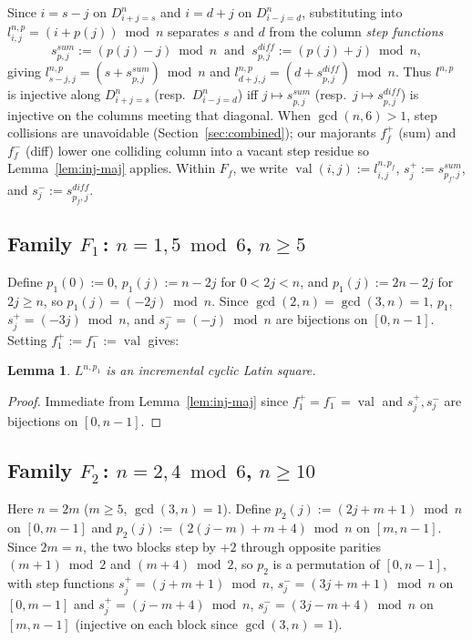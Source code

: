 \documentclass[10pt,a4paper]{article}
\newtheorem{lemma}[theorem]{Lemma}
\theoremstyle{remark}
\newcommand{\val}{\operatorname{val}}
\begin{document}
Since $i = s - j$ on $D^n_{i+j=s}$ and $i = d + j$ on $D^n_{i-j=d}$, substituting into
$l^{n,p}_{i,j} = (i + p(j)) \bmod n$ separates $s$ and $d$ from the column \emph{step functions}
\[
    s^{sum}_{p,j} := (p(j) - j) \bmod n
    \;\;\text{and}\;\;
    s^{dif\!f}_{p,j} := (p(j) + j) \bmod n,
\]
giving $l^{n,p}_{s-j,j} = (s + s^{sum}_{p,j}) \bmod n$ and
$l^{n,p}_{d+j,j} = (d + s^{dif\!f}_{p,j}) \bmod n$. Thus $l^{n,p}$ is injective along $D^n_{i+j=s}$
(resp.\ $D^n_{i-j=d}$) iff $j \mapsto s^{sum}_{p,j}$ (resp.\ $j \mapsto s^{dif\!f}_{p,j}$) is
injective on the columns meeting that diagonal. When $\gcd(n,6) > 1$, step collisions are unavoidable
(Section~\ref{sec:combined}); our majorants $f^+_f$ (sum) and $f^-_f$ (diff) lower one colliding
column into a vacant step residue so Lemma~\ref{lem:inj-maj} applies. Within $F_f$, we write
$\val(i,j) := l^{n,p_f}_{i,j}$, $s^+_j := s^{sum}_{p_f,j}$, and $s^-_j := s^{dif\!f}_{p_f,j}$.

\subsection[Family 1]{Family $F_1$\,: $n = 1,5 \bmod 6$, $n \ge 5$}

Define $p_1(0) := 0$, $p_1(j) := n - 2j$ for $0 < 2j < n$, and $p_1(j) := 2n - 2j$ for $2j \ge n$, so
$p_1(j) = (-2j) \bmod n$. Since $\gcd(2,n) = \gcd(3,n) = 1$, $p_1$, $s^+_j = (-3j) \bmod n$, and
$s^-_j = (-j) \bmod n$ are bijections on $[0,n-1]$. Setting $f^+_1 := f^-_1 := \val$ gives:

\begin{lemma}\label{lem:fam1}
$L^{n,p_1}$ is an incremental cyclic Latin square.
\end{lemma}

\begin{proof}
Immediate from Lemma~\ref{lem:inj-maj} since $f^+_1 = f^-_1 = \val$ and $s^+_j, s^-_j$ are bijections
on $[0,n-1]$.
\end{proof}

\subsection[Family 2]{Family $F_2$\,: $n = 2,4 \bmod 6$, $n \ge 10$}

Here $n = 2m$ ($m \ge 5$, $\gcd(3,n) = 1$). Define $p_2(j) := (2j + m + 1) \bmod n$ on $[0,m-1]$ and
$p_2(j) := (2(j-m) + m + 4) \bmod n$ on $[m,n-1]$. Since $2m = n$, the two blocks step by $+2$
through opposite parities $(m+1) \bmod 2$ and $(m+4) \bmod 2$, so $p_2$ is a permutation of $[0,n-1]$,
with step functions $s^+_j = (j + m + 1) \bmod n$, $s^-_j = (3j + m + 1) \bmod n$ on $[0,m-1]$ and
$s^+_j = (j - m + 4) \bmod n$, $s^-_j = (3j - m + 4) \bmod n$ on $[m,n-1]$ (injective on each block
since $\gcd(3,n) = 1$).
\end{document}
